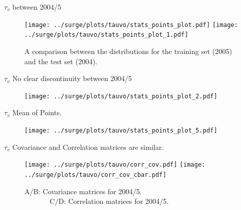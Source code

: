 \begin{frame}{$\tau_v$ between 2004/5 }
\vspace{-20pt}
\begin{figure}[htb!]
    \centering
    \texttt{[image: ../surge/plots/tauvo/stats\_points\_plot.pdf]}
     \hspace{0pt} \texttt{[image: ../surge/plots/tauvo/stats\_points\_plot\_1.pdf]}
    \vspace{-7pt}
    \caption{A comparison between the distributions for
             the training set (2005) and the test set (2004).}
    \label{fig:}
\end{figure}
\end{frame}


\begin{frame}{$\tau_v$  No clear discontinuity between 2004/5  }
\vspace{-20pt}
\begin{figure}[htb!]
    \centering
    \texttt{[image: ../surge/plots/tauvo/stats\_points\_plot\_2.pdf]}
    \vspace{-7pt}
    \caption{}
    \label{fig:}
\end{figure}
\end{frame}

\begin{frame}{$\tau_v$ Mean of Points. }
\vspace{-20pt}
\begin{figure}[htb!]
    \centering
    \texttt{[image: ../surge/plots/tauvo/stats\_points\_plot\_5.pdf]}
    \vspace{-7pt}
    \caption{}
    \label{fig:A}
\end{figure}
\end{frame}


\begin{frame}{$\tau_v$ Covariance and Correlation matrices are similar.  }
\vspace{-20pt}
\begin{figure}[htb!]
    \centering
    \hspace{-10pt}
    \texttt{[image: ../surge/plots/tauvo/corr\_cov.pdf]}
    \texttt{[image: ../surge/plots/tauvo/corr\_cov\_cbar.pdf]}
    \vspace{-7pt}
    \caption{A/B: Covariance matrices for 2004/5.\\
            $\quad\quad\quad\;\;$C/D: Correlation matrices for 2004/5.}
    \label{fig:}
\end{figure}
\end{frame}

